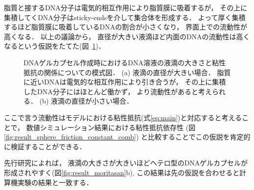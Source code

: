 脂質と接するDNA分子は電気的相互作用により脂質膜に吸着するが，
その上に集積してくDNA分子はsticky-endsを介して集合体を形成する．
よって厚く集積するほど脂質膜に吸着しているDNAの割合が小さくなり，
界面上での流動性が高くなる．
以上の議論から，
直径が大きい液滴ほど内面のDNAの流動性は高くなるという仮説をたてた(図~\ref{fig:size_and_friction})．
\begin{figure}
    \centering
    
    \caption{
        DNAゲルカプセル作成時におけるDNA溶液の液滴の大きさと粘性抵抗の関係についての模式図．
        (a) 液滴の直径が大きい場合．
            脂質に近いDNAは電気的な相互作用により引き合うが，
            その上に集積したDNA分子にはほとんど働かず，
            より流動性があると考えられる．
        (b) 液滴の直径が小さい場合．
    }
    \label{fig:size_and_friction}
\end{figure}
ここで言う流動性はモデルにおける粘性抵抗(式\ref{eq:main})と対応すると考えることで，
数値シミュレーション結果における粘性抵抗依存性
(図\ref{fig:result_sphere_friction_constant_comb})
と比較することでこの仮説を肯定的に検証することができる．

先行研究によれば，
液滴の大きさが大きいほどヘテロ型のDNAゲルカプセルが形成されやすく(図\ref{fig:result_moritasan}b), 
この結果は先の仮説を合わせると計算機実験の結果と一致する．
